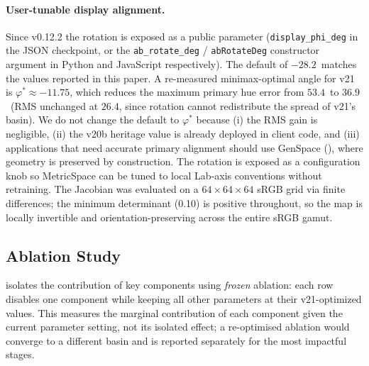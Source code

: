 \documentclass[11pt, twocolumn]{article}
\begin{document}
\paragraph{User-tunable display alignment.}
Since v0.12.2 the rotation is exposed as a public parameter
(\texttt{display\_phi\_deg} in the JSON checkpoint, or the
\texttt{ab\_rotate\_deg} / \texttt{abRotateDeg} constructor argument
in Python and JavaScript respectively). The default of $-28.2$\textdegree\
matches the values reported in this paper. A re-measured minimax-optimal
angle for v21 is $\varphi^\ast \approx -11.75$\textdegree, which reduces
the maximum primary hue error from $53.4$\textdegree\ to $36.9$\textdegree\
(RMS unchanged at $26.4$\textdegree, since rotation cannot redistribute
the spread of v21's basin). We do not change the default to $\varphi^\ast$
because (i) the RMS gain is negligible, (ii) the v20b heritage value is
already deployed in client code, and (iii) applications that need accurate
primary alignment should use GenSpace (\Cref{sec:genspace}), where geometry
is preserved by construction. The rotation is exposed as a configuration
knob so MetricSpace can be tuned to local Lab-axis conventions without
retraining.
The Jacobian was evaluated on a
$64\!\times\!64\!\times\!64$ sRGB grid via finite differences;
the minimum determinant (0.10) is positive throughout, so the
map is locally invertible and orientation-preserving across the
entire sRGB gamut.

\subsection{Ablation Study}

 isolates the contribution of key components
using \emph{frozen} ablation: each row disables one component while
keeping all other parameters at their v21-optimized values. This
measures the marginal contribution of each component given the
current parameter setting, not its isolated effect; a re-optimised
ablation would converge to a different basin and is reported
separately for the most impactful stages.
\end{document}
